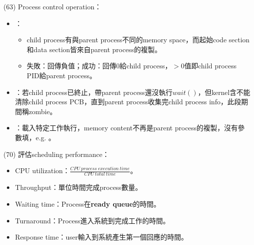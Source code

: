 \item \begin{theorem}{(63)} Process control operation： \begin{itemize}
        \item {}：\begin{itemize}
            \item child process有與parent process不同的memory space，而起始code section和data section皆來自parent process的複製。
            \item 失敗：回傳負值；成功：回傳$0$給child process，$> 0$值即child process PID給parent process。
        \end{itemize}
        \item {}：若child process已終止，帶parent process還沒執行$wait()$，但kernel含不能清除child process PCB，直到parent process收集完child process info，此段期間稱zombie。
        \item {}：載入特定工作執行，memory content不再是parent process的複製，沒有參數填，e.g. 。
    \end{itemize}
\end{theorem}

\item \begin{theorem}{(70)} 評估scheduling performance： \begin{itemize}
        \item CPU utilization：$\frac{CPU \ process \ execution \ time}{CPU \ total \ time}$。
        \item Throughput：單位時間完成process數量。
        \item Waiting time：Process在\textbf{ready queue}的時間。
        \item Turnaround：Process進入系統到完成工作的時間。
        \item Response time：user輸入到系統產生第一個回應的時間。
    \end{itemize}
\end{theorem}

